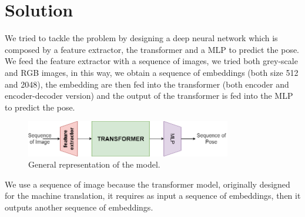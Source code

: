 
\section{Solution}\label{sec:solution}

We tried to tackle the problem by designing a deep neural network which is composed by a feature extractor, the transformer and a MLP to predict the pose.
We feed the feature extractor with a sequence of images, we tried both grey-scale and RGB images, in this way, we obtain a sequence of embeddings (both size 512 and 2048), the embedding are then fed into the transformer (both encoder and encoder-decoder version) and the output of the transformer is fed into the MLP to predict the pose.

\begin{figure}[H]
    \centering
    \includegraphics[width=0.8\textwidth]{images/1_4_general_solution}
    \caption{General representation of the model.}
    \label{fig:figure-1_4_solution}
\end{figure}

We use a sequence of image because the transformer model, originally designed for the machine translation, it requires as input a sequence of embeddings, then it outputs another sequence of embeddings.